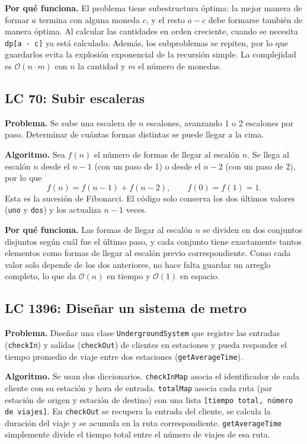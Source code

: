 \documentclass[11pt,letterpaper]{article}
\newcommand{\bigO}[1]{\ensuremath{\mathcal{O}(#1)}}
\begin{document}
\textbf{Por qué funciona.} El problema tiene subestructura óptima: la mejor manera de formar $a$ termina con alguna moneda $c$, y el resto $a-c$ debe formarse también de manera óptima. Al calcular las cantidades en orden creciente, cuando se necesita \texttt{dp[a - c]} ya está calculado. Además, los subproblemas se repiten, por lo que guardarlos evita la explosión exponencial de la recursión simple. La complejidad es \bigO{n \cdot m} con $n$ la cantidad y $m$ el número de monedas.

\subsection{LC 70: Subir escaleras}

\textbf{Problema.} Se sube una escalera de $n$ escalones, avanzando 1 o 2 escalones por paso. Determinar de cuántas formas distintas se puede llegar a la cima.

\textbf{Algoritmo.} Sea $f(n)$ el número de formas de llegar al escalón $n$. Se llega al escalón $n$ desde el $n-1$ (con un paso de 1) o desde el $n-2$ (con un paso de 2), por lo que
\[
f(n) = f(n-1) + f(n-2), \qquad f(0)=f(1)=1.
\]
Esta es la sucesión de Fibonacci. El código solo conserva los dos últimos valores (\texttt{uno} y \texttt{dos}) y los actualiza $n-1$ veces.

\textbf{Por qué funciona.} Las formas de llegar al escalón $n$ se dividen en dos conjuntos disjuntos según cuál fue el último paso, y cada conjunto tiene exactamente tantos elementos como formas de llegar al escalón previo correspondiente. Como cada valor solo depende de los dos anteriores, no hace falta guardar un arreglo completo, lo que da \bigO{n} en tiempo y \bigO{1} en espacio.

\subsection{LC 1396: Diseñar un sistema de metro}

\textbf{Problema.} Diseñar una clase \texttt{UndergroundSystem} que registre las entradas (\texttt{checkIn}) y salidas (\texttt{checkOut}) de clientes en estaciones y pueda responder el tiempo promedio de viaje entre dos estaciones (\texttt{getAverageTime}).

\textbf{Algoritmo.} Se usan dos diccionarios. \texttt{checkInMap} asocia el identificador de cada cliente con su estación y hora de entrada. \texttt{totalMap} asocia cada ruta (par estación de origen y estación de destino) con una lista \texttt{[tiempo total, número de viajes]}. En \texttt{checkOut} se recupera la entrada del cliente, se calcula la duración del viaje y se acumula en la ruta correspondiente. \texttt{getAverageTime} simplemente divide el tiempo total entre el número de viajes de esa ruta.
\end{document}

